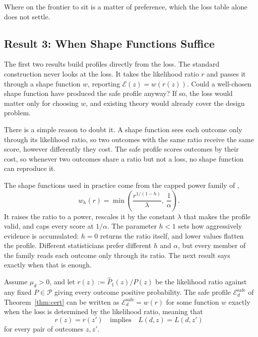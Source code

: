 Where on the frontier to sit is a matter of preference, which the loss table
alone does not settle.

\subsection{Result 3: When Shape Functions Suffice}\label{sec:result3}

The first two results build profiles directly from the loss. The standard
construction never looks at the loss. It takes the likelihood ratio $r$ and
passes it through a shape function $w$, reporting $\mathcal E(z)=w(r(z))$.
Could a well-chosen shape function have produced the safe profile anyway? If
so, the loss would matter only for choosing $w$, and existing theory would
already cover the design problem.

There is a simple reason to doubt it. A shape function sees each outcome only
through its likelihood ratio, so two outcomes with the same ratio receive the
same score, however differently they cost. The safe profile scores outcomes
by their cost, so whenever two outcomes share a ratio but not a loss, no shape
function can reproduce it.

The shape functions used in practice come from the capped power family of
\citet{KoningvanMeer2025},
\begin{equation}
 w_h(r)=\min\!\left(\frac{r^{1/(1-h)}}{\lambda},\ \frac1\alpha\right).
 \label{eq:power_shape}
\end{equation}
It raises the ratio to a power, rescales it by the constant $\lambda$ that
makes the profile valid, and caps every score at $1/\alpha$. The parameter
$h<1$ sets how aggressively evidence is accumulated: $h=0$ returns the ratio
itself, and lower values flatten the profile. Different statisticians prefer
different $h$ and $\alpha$, but every member of the family reads each outcome
only through its ratio. The next result says exactly when that is enough.

\begin{proposition}\label{prop:no_shape}
Assume $\mu_d>0$, and let $r(z):=\widehat P_1(z)/P(z)$ be the likelihood ratio
against any fixed $P\in\mathcal P$ giving every outcome positive probability.
The safe profile $\mathcal E_d^{\mathrm{safe}}$ of
Theorem~\ref{thm:cert} can be written as $\mathcal E_d^{\mathrm{safe}}=w(r)$
for some function $w$ exactly when the loss is determined by the likelihood
ratio, meaning that
\[
  r(z)=r(z')\quad\text{implies}\quad L(d,z)=L(d,z')
\]
for every pair of outcomes $z,z'$.
\end{proposition}

